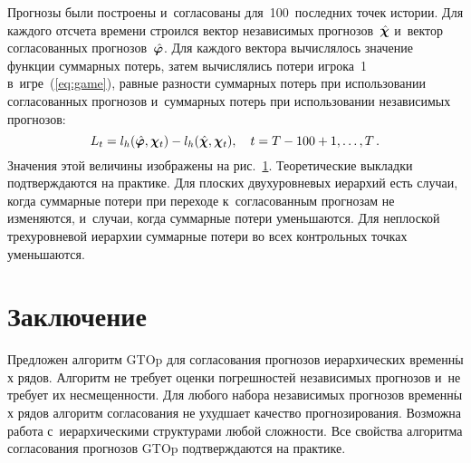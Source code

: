 \begin{multicols}{2}
 Прогнозы были
построены и~согласованы для~100~последних точек истории. Для
каждого отсчета времени строился вектор независимых прогнозов~$\hat{\boldsymbol{\chi}}$ и~вектор согласованных прогнозов~$\hat{\boldsymbol{\varphi}}$. Для каждого
вектора вычислялось значение функции суммарных потерь, затем
вычислялись потери игрока~1 в~игре~(\ref{eq:game}), равные
разности суммарных потерь при использовании согласованных
прогнозов и~суммарных потерь при использовании независимых
прогнозов:
$$
    L_t = l_h(\hat{\boldsymbol{\varphi}}, \boldsymbol{\chi}_t) - l_h(\hat{\boldsymbol{\chi}}, \boldsymbol{\chi}_t),
    \quad t = T -
    100 + 1, \ldots, T\,.
$$
Значения этой величины изображены на рис.~\ref{fig:LossDifference}.
Теоретические выкладки
подтверждаются на практике. Для плоских двухуровневых иерархий
есть случаи, когда суммарные потери при переходе к~согласованным
прогнозам не изменяются, и~случаи, когда суммарные потери
уменьшаются. Для неплоской трехуровневой иерархии суммарные потери
во всех контрольных точках уменьшаются.


\section{Заключение}

Предложен алгоритм GTOp для согласования прогнозов иерархических
временн$\acute{\mbox{ы}}$х рядов. Алгоритм не требует оценки погрешностей
независимых прогнозов и~не требует их несмещенности. Для любого
набора независимых прогнозов временн$\acute{\mbox{ы}}$х рядов алгоритм согласования
не ухудшает качество прогнозирования. Возможна работа с~иерархическими структурами любой сложности. Все свойства алгоритма
согласования прогнозов GTOp под\-тверж\-да\-ются на практике.

\pagebreak

\end{multicols}

        \begin{figure}%
    \vspace*{1pt}
 \begin{center}
 \mbox{%
 \epsfxsize=163.264mm
 }
\end{center}
 \vspace*{-9pt}
    \label{fig:LossDifference}
\end{figure}


